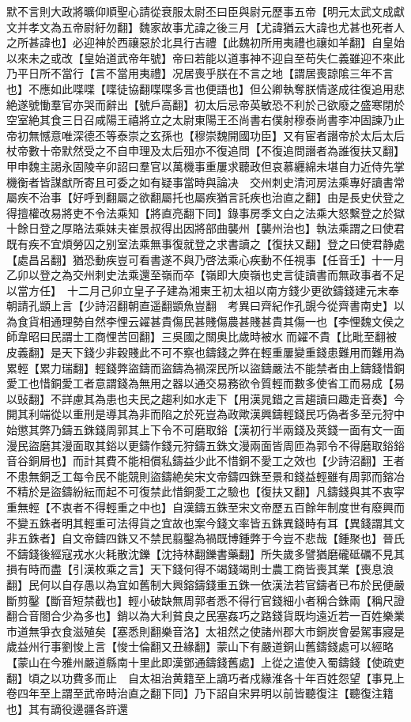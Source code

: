 默不言則大政將曠仰順聖心請從衰服太尉丕曰臣與尉元歷事五帝【明元太武文成獻文并孝文為五帝尉紆勿翻】魏家故事尤諱之後三月【尤諱猶云大諱也尤甚也死者人之所甚諱也】必迎神於西禳惡於北具行吉禮【此魏初所用夷禮也禳如羊翻】自皇始以來未之或改【皇始道武帝年號】帝曰若能以道事神不迎自至苟失仁義雖迎不來此乃平日所不當行【言不當用夷禮】况居喪乎朕在不言之地【謂居喪諒隂三年不言也】不應如此喋喋【喋徒協翻喋喋多言也便語也】但公卿執奪朕情遂成往復追用悲絶遂號慟羣官亦哭而辭出【號戶高翻】初太后忌帝英敏恐不利於己欲廢之盛寒閉於空室絶其食三日召咸陽王禧將立之太尉東陽王丕尚書右僕射穆泰尚書李冲固諫乃止帝初無憾意唯深德丕等泰崇之玄孫也【穆崇魏開國功臣】又有宦者譖帝於太后太后杖帝數十帝默然受之不自申理及太后殂亦不復追問【不復追問譖者為誰復扶又翻】甲申魏主謁永固陵辛卯詔曰羣官以萬機事重屢求聽政但哀慕纒綿未堪自力近侍先掌機衡者皆謀猷所寄且可委之如有疑事當時與論决　交州刺史清河房法乘專好讀書常屬疾不治事【好呼到翻屬之欲翻屬托也屬疾猶言託疾也治直之翻】由是長史伏登之得擅權改易將吏不令法乘知【將直亮翻下同】錄事房季文白之法乘大怒繫登之於獄十餘日登之厚賂法乘妹夫崔景叔得出因將部曲襲州【襲州治也】執法乘謂之曰使君既有疾不宜煩勞囚之别室法乘無事復就登之求書讀之【復扶又翻】登之曰使君静處【處昌呂翻】猶恐動疾豈可看書遂不與乃啓法乘心疾動不任視事【任音壬】十一月乙卯以登之為交州刺史法乘還至嶺而卒【嶺即大庾嶺也史言徒讀書而無政事者不足以當方任】　十二月己卯立皇子子建為湘東王初太祖以南方錢少更欲鑄錢建元末奉朝請孔顗上言【少詩沼翻朝直遥翻顗魚豈翻　考異曰齊紀作孔覬今從齊書南史】以為食貨相通理勢自然李悝云糴甚貴傷民甚賤傷農甚賤甚貴其傷一也【李悝魏文侯之師韋昭曰民謂士工商悝苦回翻】三吳國之關奥比歲時被水而糴不貴【比毗至翻被皮義翻】是天下錢少非穀賤此不可不察也鑄錢之弊在輕重屢變重錢患難用而難用為累輕【累力瑞翻】輕錢弊盜鑄而盜鑄為禍深民所以盜鑄嚴法不能禁者由上鑄錢惜銅愛工也惜銅愛工者意謂錢為無用之器以通交易務欲令質輕而數多使省工而易成【易以䜴翻】不詳慮其為患也夫民之趨利如水走下【用漢晁錯之言趨讀曰趣走音奏】今開其利端從以重刑是導其為非而陷之於死豈為政歟漢興鑄輕錢民巧偽者多至元狩中始懲其弊乃鑄五銖錢周郭其上下令不可磨取鋊【漢初行半兩錢及莢錢一面有文一面漫民盜磨其漫面取其鋊以更鑄作錢元狩鑄五銖文漫兩面皆周匝為郭令不得磨取鋊鋊音谷銅屑也】而計其費不能相償私鑄益少此不惜銅不愛工之效也【少詩沼翻】王者不患無銅乏工每令民不能競則盜鑄絶矣宋文帝鑄四銖至景和錢益輕雖有周郭而鎔冶不精於是盜鑄紛紜而起不可復禁此惜銅愛工之驗也【復扶又翻】凡鑄錢與其不衷寜重無輕【不衷者不得輕重之中也】自漢鑄五銖至宋文帝歷五百餘年制度世有廢興而不變五銖者明其輕重可法得貨之宜故也案今錢文率皆五銖異錢時有耳【異錢謂其文非五銖者】自文帝鑄四銖又不禁民翦鑿為禍既博鍾弊于今豈不悲哉【鍾聚也】晉氏不鑄錢後經寇戎水火耗散沈鑠【沈持林翻鑠書藥翻】所失歲多譬猶磨礲砥礪不見其損有時而盡【引漢枚乘之言】天下錢何得不竭錢竭則士農工商皆喪其業【喪息浪翻】民何以自存愚以為宜如舊制大興鎔鑄錢重五銖一依漢法若官鑄者已布於民便嚴斷剪鑿【斷音短禁截也】輕小破缺無周郭者悉不得行官錢細小者稱合銖兩【稱尺證翻合音閤合少為多也】銷以為大利貧良之民塞姦巧之路錢貨既均遠近若一百姓樂業市道無爭衣食滋殖矣【塞悉則翻樂音洛】太祖然之使諸州郡大市銅炭會晏駕事寢是歲益州行事劉悛上言【悛士倫翻又丑緣翻】蒙山下有嚴道銅山舊鑄錢處可以經略【蒙山在今雅州嚴道縣南十里此即漢鄧通鑄錢舊處】上從之遣使入蜀鑄錢【使疏吏翻】頃之以功費多而止　自太祖治黄籍至上謫巧者戍緣淮各十年百姓怨望【事見上卷四年至上謂至武帝時治直之翻下同】乃下詔自宋昇明以前皆聽復注【聽復注籍也】其有謫役邊疆各許還